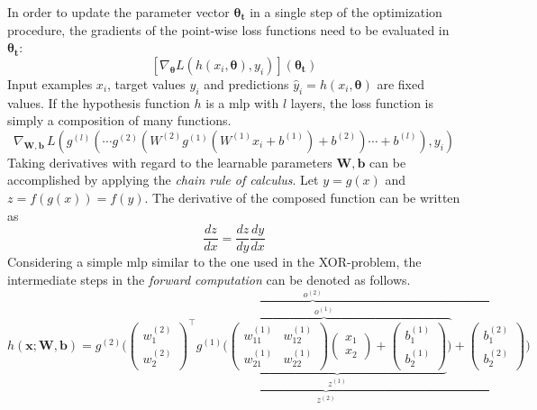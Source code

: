 In order to update the parameter vector $\boldsymbol{\theta_t}$ in a single step of the optimization procedure, the gradients of the point-wise loss functions need to be evaluated in  $\boldsymbol{\theta_t}$:
\[
    [\nabla_{\boldsymbol{\theta}}  L(h(x_i, \boldsymbol{\theta}), y_i)](\boldsymbol{\theta_t})
\]
Input examples $x_i$, target values $y_i$ and predictions $\hat{y}_i = h(x_i, \boldsymbol{\theta})$ are fixed values.
If the hypothesis function $h$ is a \gls{mlp} with $l$ layers, the loss function is simply a composition of many functions.
\[
    \nabla_{\boldsymbol{W}, \boldsymbol{b}} \, L(g^{(l)}(\cdots g^{(2)}(W^{(2)}g^{(1)}(W^{(1)}x_i + b^{(1)}) + b^{(2)}) \cdots + b^{(l)}), y_i)
\]
Taking derivatives with regard to the learnable parameters $\boldsymbol{W, b}$ can be accomplished by applying the \textit{chain rule of calculus}.
Let $y = g(x)$ and $z = f(g(x)) = f(y)$.
The derivative of the composed function can be written as
\[
    \frac{dz}{dx} = \frac{dz}{dy}\frac{dy}{dx}
\]
Considering a simple \gls{mlp} similar to the one used in the XOR-problem, the intermediate steps in the \textit{forward computation} can be denoted as follows.
\[
    h(\boldsymbol{x}; \boldsymbol{W}, \boldsymbol{b}) =
    \overbrace{
        g^{(2)}\Biggl(
        \underbrace{
            \begin{pmatrix}
                w_{1}^{(2)} \\
                w_{2}^{(2)}
            \end{pmatrix}^{\top}
            \overbrace{
                g^{(1)} \Biggl(
                \underbrace{
                    \begin{pmatrix}
                        w_{11}^{(1)} & w_{12}^{(1)} \\
                        w_{21}^{(1)} & w_{22}^{(1)}
                    \end{pmatrix}
                    \begin{pmatrix}
                        x_1 \\
                        x_2
                    \end{pmatrix}
                    +
                    \begin{pmatrix}
                        b_1^{(1)} \\
                        b_2^{(1)}
                    \end{pmatrix}
                }_{z^{(1)}}
                \Biggr)
            }^{o^{(1)}}
            +
            \begin{pmatrix}
                b_1^{(2)} \\
                b_2^{(2)}
            \end{pmatrix}
        }_{z^{(2)}}
        \Biggr)
    }^{o^{(2)}}
\]
